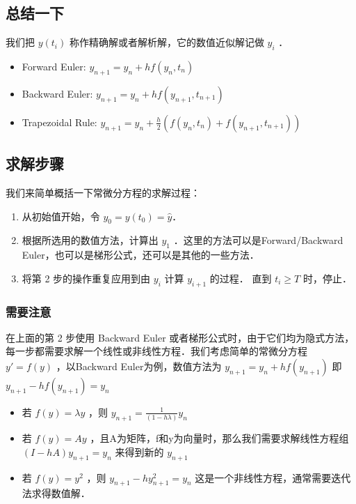 \subsection{总结一下}

我们把  $y(t_i)$  称作精确解或者解析解，它的数值近似解记做  $y_i$ ．
\begin{itemize}
\item Forward Euler:  $y_{n+1}=y_n+hf(y_n,t_n)$  
\item Backward Euler:  $y_{n+1}=y_n+hf(y_{n+1},t_{n+1})$  
\item Trapezoidal Rule:  $y_{n+1}=y_n+\frac{h}{2}\left(f(y_n,t_n)+f(y_{n+1},t_{n+1}) \right)$  
\end{itemize}


\subsection{求解步骤}

我们来简单概括一下常微分方程的求解过程：

\begin{enumerate}
\item 从初始值开始，令  $y_0=y(t_0)=\hat{y}$．
\item 根据所选用的数值方法，计算出  $y_1$  ．这里的方法可以是Forward/Backward Euler，也可以是梯形公式，还可以是其他的一些方法．
\item 将第 2 步的操作重复应用到由  $y_i$  计算  $y_{i+1}$  的过程． 直到  $t_i\ge T$  时，停止．
\end{enumerate}

\subsubsection{需要注意}

在上面的第 2 步使用 Backward Euler 或者梯形公式时，由于它们均为隐式方法，每一步都需要求解一个线性或非线性方程．我们考虑简单的常微分方程  $y'=f(y)$  ，以Backward Euler为例，数值方法为 $y_{n+1}=y_{n}+hf(y_{n+1})$  即  $y_{n+1}-hf(y_{n+1})=y_{n}$  

\begin{itemize}
\item 若  $f(y)=\lambda y$  ，则  $y_{n+1}=\frac{1}{(1-h\lambda)}y_n$  
\item 若  $f(y)=A y$  ，且A为矩阵，f和y为向量时，那么我们需要求解线性方程组  $(I-hA)y_{n+1}=y_n$  来得到新的  $y_{n+1}$
\item 若  $f(y)=y^2$  ，则  $y_{n+1}-hy^2_{n+1} = y_n$ 这是一个非线性方程，通常需要迭代法求得数值解．
\end{itemize}

